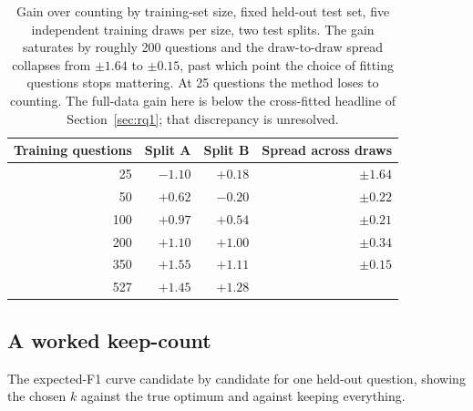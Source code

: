 \documentclass{article}
\begin{document}
\begin{table}
  \caption{Gain over counting by training-set size, fixed held-out test set, five independent training draws per size, two test splits. The gain saturates by roughly 200 questions and the draw-to-draw spread collapses from $\pm 1.64$ to $\pm 0.15$, past which point the choice of fitting questions stops mattering. At 25 questions the method loses to counting. The full-data gain here is below the cross-fitted headline of Section~\ref{sec:rq1}; that discrepancy is unresolved.}
  \label{tab:curve}
  \centering
  \begin{tabular}{rrrr}
    \toprule
    Training questions & Split A & Split B & Spread across draws \\
    \midrule
     25 & $-1.10$ & $+0.18$ & $\pm 1.64$ \\
     50 & $+0.62$ & $-0.20$ & $\pm 0.22$ \\
    100 & $+0.97$ & $+0.54$ & $\pm 0.21$ \\
    200 & $+1.10$ & $+1.00$ & $\pm 0.34$ \\
    350 & $+1.55$ & $+1.11$ & $\pm 0.15$ \\
    527 & $+1.45$ & $+1.28$ & \\
    \bottomrule
  \end{tabular}
\end{table}


\subsection{A worked keep-count}
\label{app:budget}
The expected-F1 curve candidate by candidate for one held-out question, showing the chosen $k$ against the true optimum and against keeping everything.



\newpage
\end{document}
